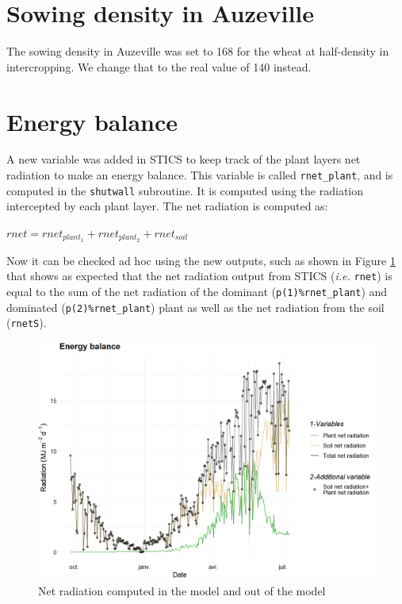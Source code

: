 \documentclass[]{book}
\begin{document}
\hypertarget{sowing-density-in-auzeville}{%
\section{Sowing density in Auzeville}\label{sowing-density-in-auzeville}}

The sowing density in Auzeville was set to 168 for the wheat at half-density in intercropping. We change that to the real value of 140 instead.

\hypertarget{energy-balance}{%
\section{Energy balance}\label{energy-balance}}

A new variable was added in STICS to keep track of the plant layers net radiation to make an energy balance. This variable is called \texttt{rnet\_plant}, and is computed in the \texttt{shutwall} subroutine. It is computed using the radiation intercepted by each plant layer. The net radiation is computed as:

\(rnet= rnet_{plant_1}+rnet_{plant_2}+rnet_{soil}\)

Now it can be checked ad hoc using the new outputs, such as shown in Figure \ref{fig:netradiation} that shows as expected that the net radiation output from STICS (\emph{i.e.} \texttt{rnet}) is equal to the sum of the net radiation of the dominant (\texttt{p(1)\%rnet\_plant}) and dominated (\texttt{p(2)\%rnet\_plant}) plant as well as the net radiation from the soil (\texttt{rnetS}).

\begin{figure}
\centering
\includegraphics{img/energy_balance.png}
\caption{\label{fig:netradiation}Net radiation computed in the model and out of the model}
\end{figure}
\end{document}
